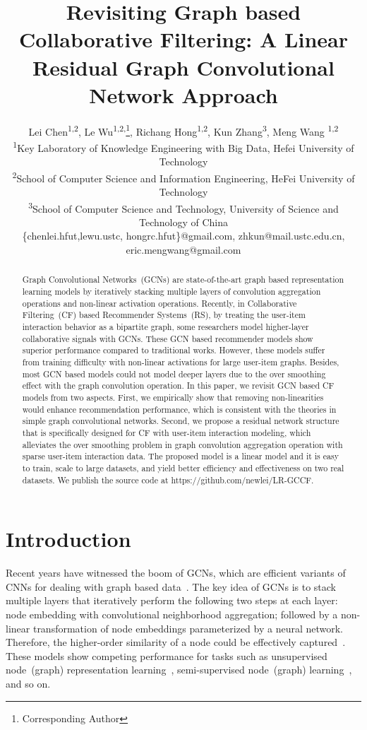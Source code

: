 \documentclass[letterpaper]{article} %
\title{Revisiting Graph based Collaborative Filtering: A Linear Residual Graph Convolutional Network Approach}
\author {
Lei Chen\textsuperscript{\rm 1,2}, 
Le Wu\textsuperscript{\rm 1,2,}\thanks{Corresponding Author}, 
Richang Hong\textsuperscript{\rm 1,2}, 
Kun Zhang\textsuperscript{\rm 3},
Meng Wang \textsuperscript{\rm 1,2} \\
\textsuperscript{\rm 1}Key Laboratory of Knowledge Engineering with Big Data, Hefei University of Technology \\
\textsuperscript{\rm 2}School of Computer Science and Information Engineering, HeFei University of Technology \\
\textsuperscript{\rm 3}School of Computer Science and Technology, University of Science and Technology of China\\ 
\{chenlei.hfut,lewu.ustc, hongrc.hfut\}@gmail.com, 
zhkun@mail.ustc.edu.cn,
eric.mengwang@gmail.com 
}
\begin{document}
\maketitle

\begin{abstract}


Graph Convolutional Networks~(GCNs) are state-of-the-art graph based representation learning models by iteratively stacking multiple layers of convolution aggregation operations and non-linear activation operations. Recently, in Collaborative Filtering~(CF) based Recommender Systems~(RS), by treating the user-item interaction behavior as a bipartite graph, some researchers model higher-layer collaborative signals with GCNs. These GCN based recommender models show superior performance compared to traditional works. However, these models suffer from training difficulty with non-linear activations for large user-item graphs. Besides, most GCN based models could not model deeper layers due to the over smoothing effect with  the graph convolution operation. In this paper, we revisit GCN based CF models from two aspects.  First, we empirically show that removing non-linearities would enhance recommendation performance, which is consistent with the theories in simple graph convolutional networks. Second, we propose a residual network structure that is specifically designed for CF with user-item interaction modeling, which alleviates the over smoothing problem in graph convolution aggregation operation with sparse user-item interaction data. The proposed model is a linear model and it is easy to train, scale to large datasets, and yield better efficiency and effectiveness on two real datasets. We publish the source code at https://github.com/newlei/LR-GCCF.
 


\end{abstract}

 

\section{Introduction}
 
  
Recent years have witnessed the boom of GCNs, which are efficient variants of CNNs for dealing with graph based data~\cite{ICLR2017semi,NIPS2017inductive}. The key idea of GCNs is to stack multiple layers that iteratively perform the following two steps at each layer: node embedding with convolutional neighborhood aggregation; followed by a non-linear transformation of node embeddings parameterized by a neural network. Therefore, the higher-order similarity of a node could be effectively captured~\cite{ICLR2019powerful,li2018deeper}. These models show competing performance for tasks such as unsupervised node~(graph) representation learning~\cite{li2016unsupervised}, semi-supervised node~(graph) learning~\cite{ICLR2017semi,camps2007semi}, and so on.
\end{document}
